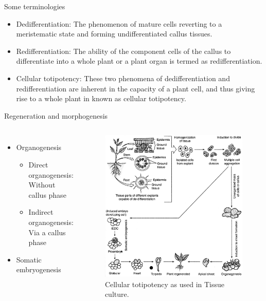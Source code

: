 \documentclass[
  ignorenonframetext,
  aspectratio=169]{beamer}
\providecommand{\tightlist}{%
  \setlength{\itemsep}{0pt}\setlength{\parskip}{0pt}}
\newcommand{\bcolumns}{\begin{columns}[T, onlytextwidth]}
\newcommand{\ecolumns}{\end{columns}}
\begin{document}
\begin{frame}{Some terminologies}
\protect\hypertarget{some-terminologies}{}
\begin{itemize}
\tightlist
\item
  Dedifferentiation: The phenomenon of mature cells reverting to a
  meristematic state and forming undifferentiated callus tissues.
\item
  Redifferentiation: The ability of the component cells of the callus to
  differentiate into a whole plant or a plant organ is termed as
  redifferentiation.
\item
  Cellular totipotency: These two phenomena of dedifferentiation and
  redifferentiation are inherent in the capacity of a plant cell, and
  thus giving rise to a whole plant in known as cellular totipotency.
\end{itemize}
\end{frame}

\begin{frame}{Regeneration and morphogenesis}
\protect\hypertarget{regeneration-and-morphogenesis}{}
\bcolumns
{}
\small

\begin{itemize}
\tightlist
\item
  Organogenesis

  \begin{itemize}
  \tightlist
  \item
    Direct organogenesis: Without callus phase
  \item
    Indirect organogenesis: Via a callus phase
  \end{itemize}
\item
  Somatic embryogenesis
\end{itemize}


\begin{figure}
\includegraphics[width=0.7\linewidth]{../images/culture_organogenesis_embryogenesis} \caption{Cellular totipotency as used in Tissue culture.}\label{fig:culture-embryo-organ}
\end{figure}

\ecolumns
\end{frame}
\end{document}
